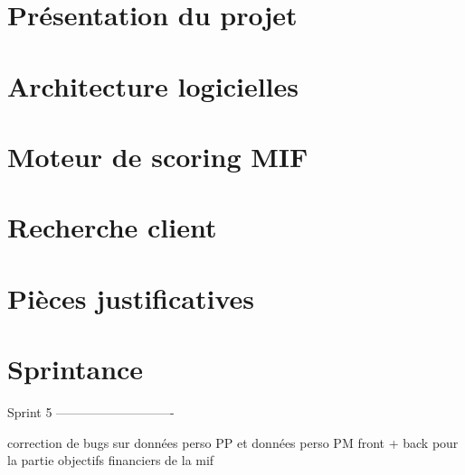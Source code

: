 
\section{Présentation du projet}
	

\section{Architecture logicielles}
	

\section{Moteur de scoring MIF}
	\label{moteurScoring}
	
	
\section{Recherche client}
	
	
\section{Pièces justificatives}
	
		
\section{Sprintance}

Sprint 5 ----------------------------
	
	correction de bugs sur données perso PP et données perso PM
	front  + back pour la partie objectifs financiers de la mif
	
